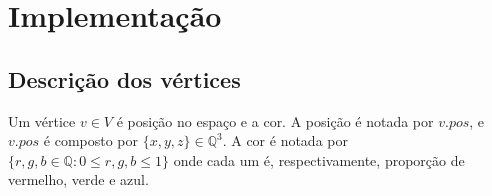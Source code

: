 

\chapter{Implementação}



\section{Descrição dos vértices}
Um vértice $v \in V$ é posição no espaço e a cor. A
posição é notada por $v.pos$, e $v.pos$ é composto por 
$\{x, y, z\} \in \mathbb{Q}^3$. A cor
é notada por $\{r, g, b \in \mathbb{Q}:0 \leq r, g, b \leq 1\}$ onde cada um é,
respectivamente, proporção de vermelho, verde e azul.


